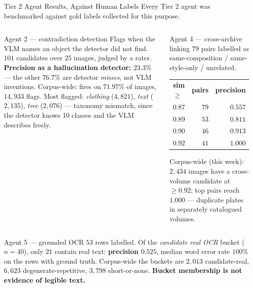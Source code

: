 \documentclass[aspectratio=169,11pt]{beamer}
\begin{document}
\begin{frame}{Tier 2 Agent Results, Against Human Labels}
\scriptsize
Every Tier 2 agent was benchmarked against gold labels collected for this purpose.
\vspace{1mm}
\begin{columns}[T]
\begin{block}{\scriptsize Agent 2 --- contradiction detection}
\tiny Flags when the VLM names an object the detector did not find. $101$ candidates over $25$ images, judged by a rater.
\vskip 2pt
\textbf{Precision as a hallucination detector: $\mathbf{23.3\%}$} --- the other $76.7\%$ are detector \emph{misses}, not VLM inventions.
\vskip 2pt
Corpus-wide: fires on $71.97\%$ of images, $14{,}933$ flags. Most flagged: \emph{clothing} ($4{,}821$), \emph{text} ($2{,}135$), \emph{tree} ($2{,}076$) --- taxonomy mismatch, since the detector knows 10 classes and the VLM describes freely.
\end{block}

\begin{block}{\scriptsize Agent 4 --- cross-archive linking}
\tiny $79$ pairs labelled as same-composition / same-style-only / unrelated.
\vskip 2pt
\begin{tabular}{@{}l r r@{}}
\textbf{sim $\ge$} & \textbf{pairs} & \textbf{precision} \\
$0.87$ & $79$ & $0.557$ \\
$0.89$ & $53$ & $0.811$ \\
$0.90$ & $46$ & $0.913$ \\
$\mathbf{0.92}$ & $41$ & $\mathbf{1.000}$ \\
\end{tabular}
\vskip 2pt
Corpus-wide (this week): $2{,}434$ images have a cross-volume candidate at $\ge0.92$; top pairs reach $1.000$ --- duplicate plates in separately catalogued volumes.
\end{block}
\end{columns}
\vspace{1mm}
\begin{alertblock}{\scriptsize Agent 5 --- grounded OCR}
\tiny $53$ rows labelled. Of the \emph{candidate real OCR} bucket ($n{=}40$), only $21$ contain real text: \textbf{precision $0.525$}, median word error rate $100\%$ on the rows with ground truth. Corpus-wide the buckets are $2{,}013$ candidate-real, $6{,}623$ degenerate-repetitive, $3{,}798$ short-or-none. \textbf{Bucket membership is not evidence of legible text.}
\end{alertblock}
\end{frame}
\end{document}
